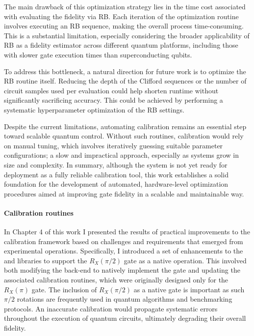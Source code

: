 The main drawback of this optimization strategy lies in the time cost associated with evaluating the fidelity via RB. 
Each iteration of the optimization routine involves executing an RB sequence, making the overall process time-consuming. 
This is a substantial limitation, especially considering the broader applicability of RB as a fidelity estimator across different quantum platforms, including those with slower gate execution times than superconducting qubits.

To address this bottleneck, a natural direction for future work is to optimize the RB routine itself. 
Reducing the depth of the Clifford sequences or the number of circuit samples used per evaluation could help shorten runtime without significantly sacrificing accuracy. 
This could be achieved by performing a systematic hyperparameter optimization of the RB settings. 

Despite the current limitations, automating calibration remains an essential step toward scalable quantum control. 
Without such routines, calibration would rely on manual tuning, which involves iteratively guessing suitable parameter configurations; a slow and impractical approach, especially as systems grow in size and complexity. 
In summary, although the system is not yet ready for deployment as a fully reliable calibration tool, this work establishes a solid foundation for the development of automated, hardware-level optimization procedures aimed at improving gate fidelity in a scalable and maintainable way.


\paragraph{Calibration routines}
In Chapter 4 of this work I presented the results of practical improvements to the calibration framework based on challenges and requirements that emerged from experimental operations. 
Specifically, I introduced a set of enhancements to the \Qibolab and \Qibocal libraries to support the $R_X(\pi/2)$ gate as a native operation. 
This involved both modifying the back-end to natively implement the gate and updating the associated calibration routines, which were originally designed only for the $R_X(\pi)$ gate.
The inclusion of $R_X(\pi/2)$ as a native gate is important as such $\pi/2$ rotations are frequently used in quantum algorithms and benchmarking protocols. 
An inaccurate calibration would propagate systematic errors throughout the execution of quantum circuits, ultimately degrading their overall fidelity.

